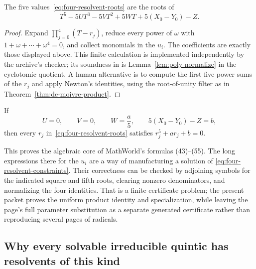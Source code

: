 \begin{theorem}\label{thm:four-resolvent}
The five values~\eqref{eq:four-resolvent-roots} are the roots of
\begin{equation}\label{eq:four-resolvent-product}
 T^5-5UT^3-5VT^2+5WT+5(X_0-Y_0)-Z.
\end{equation}
\end{theorem}

\begin{proof}
Expand \(\prod_{j=0}^4(T-r_j)\), reduce every power of \(\omega\) with
\(1+\omega+\cdots+\omega^4=0\), and collect monomials in the \(u_i\).  The
coefficients are exactly those displayed above.  This finite calculation is
implemented independently by the archive's checker; its soundness in \ipra{}
is Lemma~\ref{lem:poly-normalize} in the cyclotomic quotient.  A human
alternative is to compute the first five power sums of the \(r_j\) and apply
Newton's identities, using the root-of-unity filter as in
Theorem~\ref{thm:de-moivre-product}.
\end{proof}

\begin{corollary}
\label{cor:four-resolvent-specialization}
If
\begin{equation}\label{eq:four-resolvent-constraints}
 U=0,
 \qquad V=0,
 \qquad W=\frac a5,
 \qquad 5(X_0-Y_0)-Z=b,
\end{equation}
then every \(r_j\) in~\eqref{eq:four-resolvent-roots} satisfies
\(r_j^5+ar_j+b=0\).
\end{corollary}

This proves the algebraic core of MathWorld's formulas (43)--(55).  The long
expressions there for the \(u_i\) are a way of manufacturing a solution of
\eqref{eq:four-resolvent-constraints}.  Their correctness can be checked by
adjoining symbols for the indicated square and fifth roots, clearing
nonzero denominators, and normalizing the four identities.  That is a finite
certificate problem; the present packet proves the uniform product identity
and specialization, while leaving the page's full parameter substitution as a
separate generated certificate rather than reproducing several pages of
radicals.

\subsection{Why every solvable irreducible quintic has resolvents of this kind}

